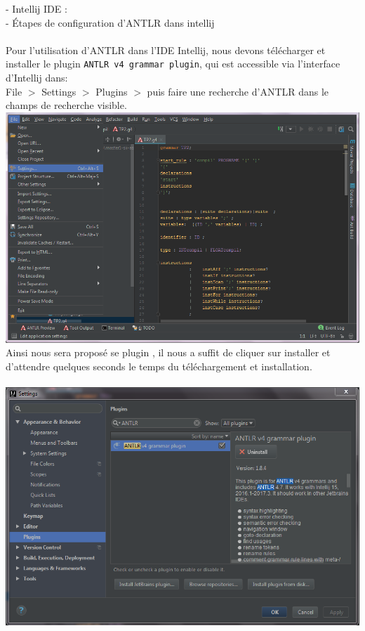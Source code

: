 \documentclass[12pt]{article}
\begin{document}
\color{blue}
-	Intellij IDE :\\
\color{black}
-	Étapes de configuration d'ANTLR dans intellij\\
\textbf{ }\\
Pour l'utilisation d'ANTLR dans l'IDE Intellij, nous devons télécharger et installer le plugin \texttt{ANTLR v4 grammar plugin}, qui est accessible via l'interface d'Intellij dans:\\
File $>$ Settings $>$ Plugins $>$ puis faire une recherche d'ANTLR dans le champs de recherche visible. 
\textbf{ }\\
\includegraphics[width=1\textwidth]{IMG/Configuration1.png}
\textbf{ }\\
Ainsi nous sera proposé se plugin , il nous a suffit de cliquer sur installer et d'attendre quelques seconds le temps du téléchargement et installation.\\
\texttt{ }\\
\includegraphics[width=1\textwidth]{IMG/Configuration2.png}
\end{document}
